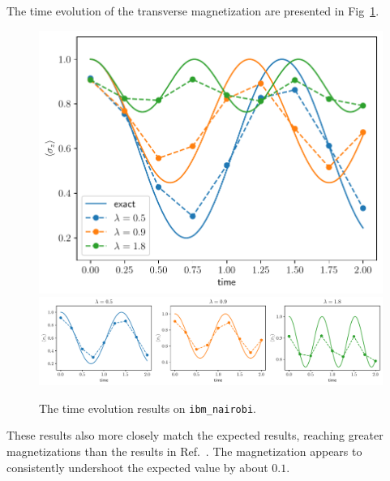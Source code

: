 \documentclass[12pt]{article}
\begin{document}
  The time evolution of the transverse magnetization are presented in Fig~\ref{fig:time-evolution-mangetization}.
  \begin{figure}
      \centering
      \includegraphics[width=\textwidth]{images/time-evolution-magnetization}
      \includegraphics[width=\textwidth]
        {images/time-evolution-magnetization-separate}
      \caption{The time evolution results on \texttt{ibm\_nairobi}.%
        \label{fig:time-evolution-mangetization}}
  \end{figure}
  These results also more closely match the expected results, reaching greater magnetizations than the results in Ref.~\cite{CerveraLierta18}. The magnetization appears to consistently undershoot the expected value by about \( 0.1 \).

  \printbibliography
\end{document}
